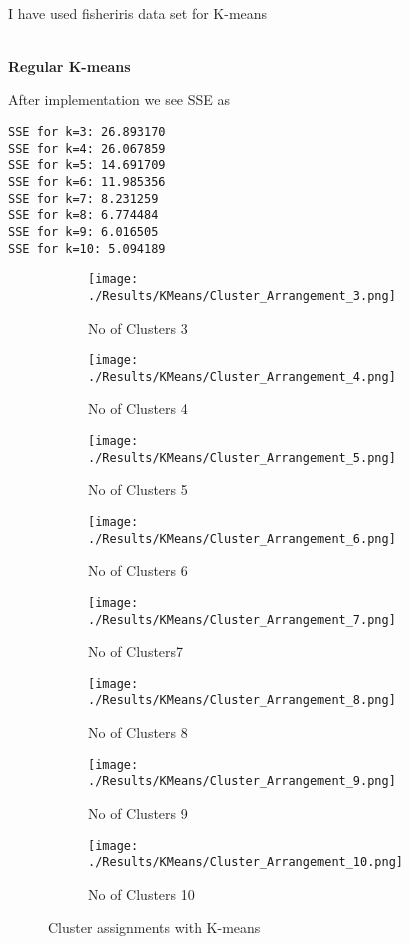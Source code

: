 \documentclass[11pt]{article}
\begin{document}
\\

I have used fisheriris data set for K-means

\\
\textbf{Regular K-means}

After implementation we see SSE as

\begin{verbatim}
SSE for k=3: 26.893170
SSE for k=4: 26.067859
SSE for k=5: 14.691709
SSE for k=6: 11.985356
SSE for k=7: 8.231259
SSE for k=8: 6.774484
SSE for k=9: 6.016505
SSE for k=10: 5.094189
\end{verbatim} 


\begin{figure}[htbp]
	\centering
	\begin{subfigure}[b]{0.3\textwidth}
		\texttt{[image: ./Results/KMeans/Cluster\_Arrangement\_3.png]}
		\caption{No of Clusters 3}
		\label{fig:cluster3}
	\end{subfigure}
	\begin{subfigure}[b]{0.3\textwidth}
		\texttt{[image: ./Results/KMeans/Cluster\_Arrangement\_4.png]}
		\caption{No of Clusters 4}
		\label{fig:cluster4}
	\end{subfigure}
	\begin{subfigure}[b]{0.3\textwidth}
		\texttt{[image: ./Results/KMeans/Cluster\_Arrangement\_5.png]}
		\caption{No of Clusters 5}
		\label{fig:cluster5}
	\end{subfigure}
	
	\begin{subfigure}[b]{0.3\textwidth}
		\texttt{[image: ./Results/KMeans/Cluster\_Arrangement\_6.png]}
		\caption{No of Clusters 6}
		\label{fig:cluster6}
	\end{subfigure}
	\begin{subfigure}[b]{0.3\textwidth}
		\texttt{[image: ./Results/KMeans/Cluster\_Arrangement\_7.png]}
		\caption{No of Clusters7}
		\label{fig:cluster7}
	\end{subfigure}
	\begin{subfigure}[b]{0.3\textwidth}
		\texttt{[image: ./Results/KMeans/Cluster\_Arrangement\_8.png]}
		\caption{No of Clusters 8}
		\label{fig:cluster8}
	\end{subfigure}
	
	\begin{subfigure}[b]{0.3\textwidth}
		\texttt{[image: ./Results/KMeans/Cluster\_Arrangement\_9.png]}
		\caption{No of Clusters 9}
		\label{fig:cluster9}
	\end{subfigure}
	\begin{subfigure}[b]{0.3\textwidth}
		\texttt{[image: ./Results/KMeans/Cluster\_Arrangement\_10.png]}
		\caption{No of Clusters 10}
		\label{fig:cluster10}
	\end{subfigure}
	\caption{Cluster assignments with K-means}
	\label{fig:clusterassignments}
\end{figure}
\end{document}
